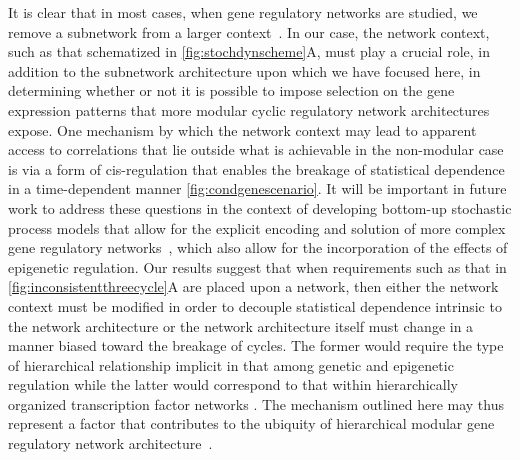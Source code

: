 It is clear that in most cases, when gene regulatory networks are studied, we remove a subnetwork from a larger context~\cite{Alon2007}. In our case, the network context, such as that schematized in \ref{fig:stochdynscheme}A, must play a crucial role, in addition to the subnetwork architecture upon which we have focused here, in determining whether or not it is possible to impose selection on the gene expression patterns that more modular cyclic regulatory network architectures expose. One mechanism by which the network context may lead to apparent access to correlations that lie outside what is achievable in the non-modular case is via a form of cis-regulation that enables the breakage of statistical dependence in a time-dependent manner \ref{fig:condgenescenario}. It will be important in future work to address these questions in the context of developing bottom-up stochastic process models that allow for the explicit encoding and solution of more complex gene regulatory networks~\cite{Walczak2009,Mugler2009}, which also allow for the incorporation of the effects of epigenetic regulation. Our results suggest that when requirements such as that in \ref{fig:inconsistentthreecycle}A are placed upon a network, then either the network context must be modified in order to decouple statistical dependence intrinsic to the network architecture or the network architecture itself must change in a manner biased toward the breakage of cycles. The former would require the type of hierarchical relationship implicit in that among genetic and epigenetic regulation while the latter would correspond to that within hierarchically organized transcription factor networks \cite{Jothi2009,Bhardwaj2010,Chalancon2012,Colm}. The mechanism outlined here may thus represent a factor that contributes to the ubiquity of hierarchical modular gene regulatory network architecture~\cite{Ravasz2002,Segre2005,Wagner2007,Erwin2009,Jothi2009,Bhardwaj2010,Colm}.

